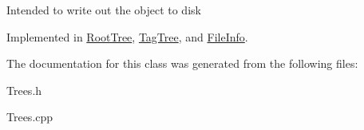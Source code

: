 Intended to write out the object to disk 

Implemented in \mbox{\hyperlink{classRootTree_a6df5a227c60c44ad84207eb296c52af9}{Root\+Tree}}, \mbox{\hyperlink{classTagTree_ae316c2517c607547f02ce43b63a6316d}{Tag\+Tree}}, and \mbox{\hyperlink{classFileInfo_a15d8f9279f1d60e4db4618cb81e68414}{File\+Info}}.



The documentation for this class was generated from the following files\+:\begin{DoxyCompactItemize}
\item 
Trees.\+h\item 
Trees.\+cpp\end{DoxyCompactItemize}
